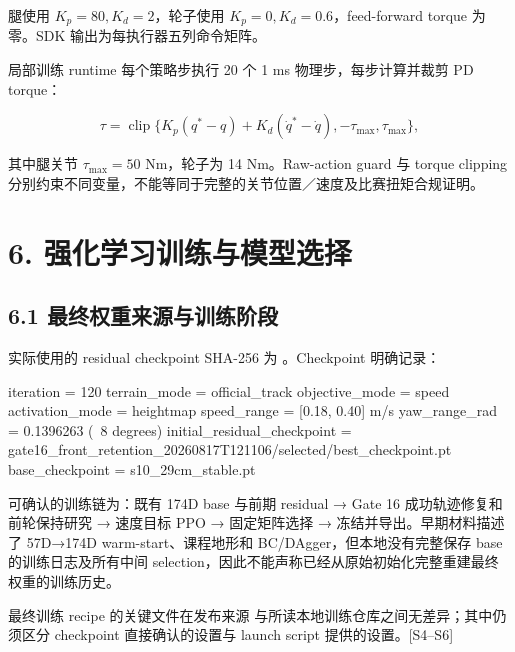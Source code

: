 \documentclass[
  10pt,
  a4paper,
]{article}
\begin{document}
腿使用 \(K_p=80,K_d=2\)，轮子使用 \(K_p=0,K_d=0.6\)，feed-forward torque
为零。SDK 输出为每执行器五列命令矩阵。

局部训练 runtime 每个策略步执行 20 个 1 ms 物理步，每步计算并裁剪 PD
torque：

\[
\tau=\operatorname{clip}\{K_p(q^*-q)+K_d(\dot q^*-\dot q),-\tau_{\mathrm{max}},\tau_{\mathrm{max}}\},
\]

其中腿关节 \(\tau_{\mathrm{max}}=50\) Nm，轮子为 14 Nm。Raw-action guard
与 torque clipping
分别约束不同变量，不能等同于完整的关节位置／速度及比赛扭矩合规证明。

\FloatBarrier

\section{6.
强化学习训练与模型选择}\label{ux5f3aux5316ux5b66ux4e60ux8badux7ec3ux4e0eux6a21ux578bux9009ux62e9}

\subsection{6.1
最终权重来源与训练阶段}\label{ux6700ux7ec8ux6743ux91cdux6765ux6e90ux4e0eux8badux7ec3ux9636ux6bb5}

实际使用的 residual checkpoint SHA-256 为
{\ttfamily\small{}}。Checkpoint
明确记录：

\par
\begin{minipage}{\linewidth}
\begin{ReportCode}
iteration = 120
terrain_mode = official_track
objective_mode = speed
activation_mode = heightmap
speed_range = [0.18, 0.40] m/s
yaw_range_rad = 0.1396263  (~8 degrees)
initial_residual_checkpoint = gate16_front_retention_20260817T121106/selected/best_checkpoint.pt
base_checkpoint = s10_29cm_stable.pt
\end{ReportCode}
\end{minipage}
\par

可确认的训练链为：既有 174D base 与前期 residual → Gate 16
成功轨迹修复和前轮保持研究 → {\ttfamily\small{}}
速度目标 PPO → 固定矩阵选择 → 冻结并导出。早期材料描述了 57D→174D
warm-start、课程地形和 BC/DAgger，但本地没有完整保存 base
的训练日志及所有中间
selection，因此不能声称已经从原始初始化完整重建最终权重的训练历史。

最终训练 recipe 的关键文件在发布来源 {\ttfamily\small{}}
与所读本地训练仓库之间无差异；其中仍须区分 checkpoint 直接确认的设置与
launch script 提供的设置。{[}S4--S6{]}
\end{document}
